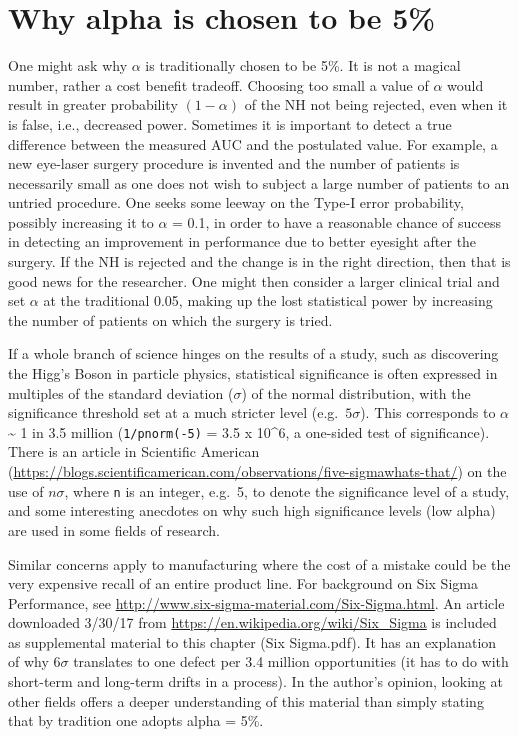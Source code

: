 \documentclass[
]{book}
\begin{document}
\hypertarget{why-alpha-is-chosen-to-be-5}{%
\section{Why alpha is chosen to be 5\%}\label{why-alpha-is-chosen-to-be-5}}

One might ask why \(\alpha\) is traditionally chosen to be 5\%. It is not a magical number, rather a cost benefit tradeoff. Choosing too small a value of \(\alpha\) would result in greater probability \((1-\alpha)\) of the NH not being rejected, even when it is false, i.e., decreased power. Sometimes it is important to detect a true difference between the measured AUC and the postulated value. For example, a new eye-laser surgery procedure is invented and the number of patients is necessarily small as one does not wish to subject a large number of patients to an untried procedure. One seeks some leeway on the Type-I error probability, possibly increasing it to \(\alpha\) = 0.1, in order to have a reasonable chance of success in detecting an improvement in performance due to better eyesight after the surgery. If the NH is rejected and the change is in the right direction, then that is good news for the researcher. One might then consider a larger clinical trial and set \(\alpha\) at the traditional 0.05, making up the lost statistical power by increasing the number of patients on which the surgery is tried.

If a whole branch of science hinges on the results of a study, such as discovering the Higg's Boson in particle physics, statistical significance is often expressed in multiples of the standard deviation (\(\sigma\)) of the normal distribution, with the significance threshold set at a much stricter level (e.g.~\(5\sigma\)). This corresponds to \(\alpha\) \textasciitilde{} 1 in 3.5 million (\texttt{1/pnorm(-5)} = 3.5 x 10\^{}6, a one-sided test of significance). There is an article in Scientific American (\url{https://blogs.scientificamerican.com/observations/five-sigmawhats-that/}) on the use of \(n\sigma\), where \texttt{n} is an integer, e.g.~5, to denote the significance level of a study, and some interesting anecdotes on why such high significance levels (low alpha) are used in some fields of research.

Similar concerns apply to manufacturing where the cost of a mistake could be the very expensive recall of an entire product line. For background on Six Sigma Performance, see \url{http://www.six-sigma-material.com/Six-Sigma.html}. An article downloaded 3/30/17 from \url{https://en.wikipedia.org/wiki/Six_Sigma} is included as supplemental material to this chapter (Six Sigma.pdf). It has an explanation of why \(6\sigma\) translates to one defect per 3.4 million opportunities (it has to do with short-term and long-term drifts in a process). In the author's opinion, looking at other fields offers a deeper understanding of this material than simply stating that by tradition one adopts alpha = 5\%.
\end{document}
